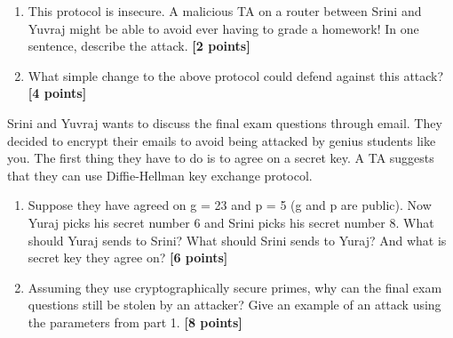 \documentclass{article}
\begin{document}
\begin{enumerate}
\item{ This protocol is insecure.  A malicious TA on a router between Srini and Yuvraj might be able to avoid ever having to grade a homework!  In one sentence, describe the attack. \textbf{[2 points]}}

\item{ What simple change to the above protocol could defend against
this attack? \textbf{[4 points]}}
\end{enumerate}

Srini and Yuvraj wants to discuss the final exam questions through email. They decided to encrypt their emails to avoid being attacked by genius students like you. The first thing they have to do is to agree on a secret key. A TA suggests that they can use Diffie-Hellman key exchange protocol.

\begin{enumerate}    
\item Suppose they have agreed on g = 23 and p = 5 (g and p are public). Now Yuraj picks his secret number 6 and Srini picks his secret number 8. What should Yuraj sends to Srini? What should Srini sends to Yuraj? And what is secret key they agree on? \textbf{[6 points]}

\item Assuming they use cryptographically secure primes, why can the final exam questions still be stolen by an attacker? Give an example of an attack using the parameters from part 1. \textbf{[8 points]}
\end{enumerate}
\end{document}
